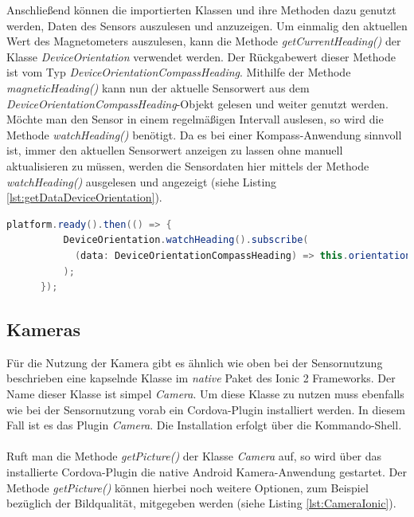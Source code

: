 Anschließend können die importierten Klassen und ihre Methoden dazu genutzt werden, Daten des Sensors auszulesen und anzuzeigen. Um einmalig den aktuellen Wert des Magnetometers auszulesen, kann die Methode \textit{getCurrentHeading()} der Klasse \textit{DeviceOrientation} verwendet werden. Der Rückgabewert dieser Methode ist vom Typ \textit{DeviceOrientationCompassHeading}. Mithilfe der Methode \textit{magneticHeading()} kann nun der aktuelle Sensorwert aus dem \textit{DeviceOrientationCompassHeading}-Objekt gelesen und weiter genutzt werden. Möchte man den Sensor in einem regelmäßigen Intervall auslesen, so wird die Methode \textit{watchHeading()} benötigt. Da es bei einer Kompass-Anwendung sinnvoll ist, immer den aktuellen Sensorwert anzeigen zu lassen ohne manuell aktualisieren zu müssen, werden die Sensordaten hier mittels der Methode \textit{watchHeading()} ausgelesen und angezeigt (siehe Listing \ref{lst:getDataDeviceOrientation}). 

\begin{lstlisting}[caption=Auslesen der Daten des Magnetometers mithilfe der Methode \textit{watchHeading()}, label=lst:getDataDeviceOrientation, language=Java]
platform.ready().then(() => {
          DeviceOrientation.watchHeading().subscribe(
            (data: DeviceOrientationCompassHeading) => this.orientation2 = data.magneticHeading.toString()
          );
      });
\end{lstlisting}

\subsection*{Kameras}

Für die Nutzung der Kamera gibt es ähnlich wie oben bei der Sensornutzung beschrieben eine kapselnde Klasse im \textit{native} Paket des Ionic 2 Frameworks. Der Name dieser Klasse ist simpel \textit{Camera}. Um diese Klasse zu nutzen muss ebenfalls wie bei der Sensornutzung vorab ein Cordova-Plugin installiert werden. In diesem Fall ist es das Plugin \textit{Camera}. Die Installation erfolgt über die Kommando-Shell. 
\\
\\
Ruft man die Methode \textit{getPicture()} der Klasse \textit{Camera} auf, so wird über das installierte Cordova-Plugin die native Android Kamera-Anwendung gestartet. Der Methode \textit{getPicture()} können hierbei noch weitere Optionen, zum Beispiel bezüglich der Bildqualität, mitgegeben werden (siehe Listing \ref{lst:CameraIonic}). 

